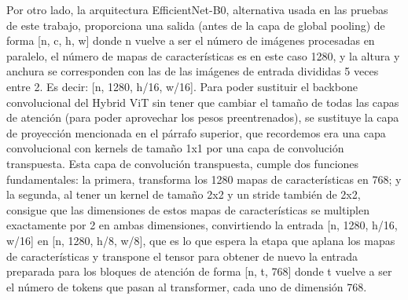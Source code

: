 Por otro lado, la arquitectura EfficientNet-B0, alternativa usada en las pruebas de este trabajo, proporciona una salida (antes de la capa de global pooling) de forma [n, c, h, w] donde n vuelve a ser el número de imágenes procesadas en paralelo, el número de mapas de características es en este caso 1280, y la altura y anchura se corresponden con las de las imágenes de entrada divididas 5 veces entre 2. Es decir: [n, 1280, h/16, w/16]. Para poder sustituir el backbone convolucional del Hybrid ViT sin tener que cambiar el tamaño de todas las capas de atención (para poder aprovechar los pesos preentrenados), se sustituye la capa de proyección mencionada en el párrafo superior, que recordemos era una capa convolucional con kernels de tamaño 1x1 por una capa de convolución transpuesta. Esta capa de convolución transpuesta, cumple dos funciones fundamentales: la primera, transforma los 1280 mapas de características en 768; y la segunda, al tener un kernel de tamaño 2x2 y un stride también de 2x2, consigue que las dimensiones de estos mapas de características se multiplen exactamente por 2 en ambas dimensiones, convirtiendo la entrada [n, 1280, h/16, w/16] en [n, 1280, h/8, w/8], que es lo que espera la etapa que aplana los mapas de características y transpone el tensor para obtener de nuevo la entrada preparada para los bloques de atención de forma [n, t, 768] donde t vuelve a ser el número de tokens que pasan al transformer, cada uno de dimensión 768.




\clearpage